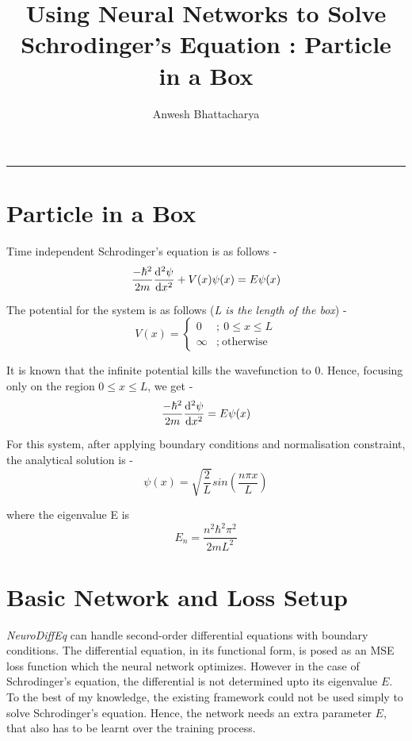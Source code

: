 \documentclass{article}
\newcommand{\NeuroDiffEq}{\textit{NeuroDiffEq} }
\begin{document}


\title{\textbf{Using Neural Networks to Solve Schrodinger's Equation : Particle in a Box}}
\author{Anwesh Bhattacharya}
\maketitle
\hrule

\section{Particle in a Box}

\justify
Time independent Schrodinger's equation is as follows -
$$\displaystyle{\frac{-\hbar^2}{2m} \dv[2]{\psi}{x}  + V(x)\psi(x) = E\psi(x)}$$


\justify
The potential for the system is as follows (\textit{L is the length of the box}) -
$$V(x) =
\left\{
	\begin{array}{ll}
		0  & ; \ 0 \leq x \leq L \\
		\infty & ; \ \text{otherwise}
	\end{array}
\right.
$$


\justify
It is known that the infinite potential kills the wavefunction to 0. Hence, focusing only on the region $0 \leq x \leq L$, we get -
$$\displaystyle{
\frac{-\hbar^2}{2m} \dv[2]{\psi}{x} = E\psi(x)
}$$

\justify
For this system, after applying boundary conditions and normalisation constraint, the analytical solution is -
$$\displaystyle{
\psi(x) = \sqrt{\frac{2}{L}} sin(\frac{n\pi x}{L})
}$$

\justify
where the eigenvalue E is
$$\displaystyle{
E_n = \frac{n^2 \hbar^2 \pi^2}{2 m L^2} 
}$$

\section{Basic Network and Loss Setup}

\justify
\NeuroDiffEq can handle second-order differential equations with boundary conditions. The differential equation, in its functional form, is posed as an MSE loss function which the neural network optimizes. However in the case of Schrodinger's equation, the differential is not determined upto its eigenvalue $E$. To the best of my knowledge, the existing framework could not be used simply to solve Schrodinger's equation. Hence, the network needs an extra parameter $E$, that also has to be learnt over the training process. 
\end{document}

